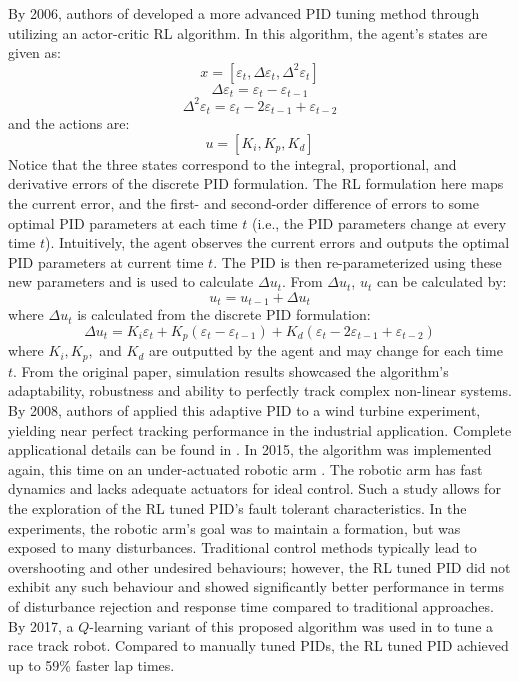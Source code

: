 By 2006, authors of \cite{pid2} developed a more advanced PID tuning method through utilizing an actor-critic RL algorithm.  In this algorithm, the agent's states are given as:
$$x = [\varepsilon_t, \Delta \varepsilon_t, \Delta^2 \varepsilon_t]$$
$$\Delta \varepsilon_t = \varepsilon_t - \varepsilon_{t-1}$$
$$\Delta^2 \varepsilon_t = \varepsilon_t - 2\varepsilon_{t-1} + \varepsilon_{t-2}$$
and the actions are:
$$u = [K_i, K_p, K_d]$$
Notice that the three states correspond to the integral, proportional, and derivative errors of the discrete PID formulation. The RL formulation here maps the current error, and the first- and second-order difference of errors to some optimal PID parameters at each time $t$ (i.e., the PID parameters change at every time $t$). Intuitively, the agent observes the current errors and outputs the optimal PID parameters at current time $t$. The PID is then re-parameterized using these new parameters and is used to calculate $\Delta u_t$.  From $\Delta u_t$, $u_t$ can be calculated by:
$$u_t = u_{t-1} + \Delta u_t$$
where $\Delta u_t$ is calculated from the discrete PID formulation:
\begin{equation}
    \Delta u_t = K_i \varepsilon_t + K_p (\varepsilon_t - \varepsilon_{t-1}) + K_d (\varepsilon_t - 2\varepsilon_{t-1} + \varepsilon_{t-2})
\end{equation}
where $K_i, K_p,$ and $K_d$ are outputted by the agent and may change for each time $t$. From the original paper, simulation results showcased the algorithm's adaptability, robustness and ability to perfectly track complex non-linear systems. By 2008, authors of \cite{pid3} applied this adaptive PID to a wind turbine experiment, yielding near perfect tracking performance in the industrial application.  Complete applicational details can be found in \cite{pid3}. In 2015, the algorithm was implemented again, this time on an under-actuated robotic arm \cite{pid4}. The robotic arm has fast dynamics and lacks adequate actuators for ideal control.  Such a study allows for the exploration of the RL tuned PID's fault tolerant characteristics.  In the experiments, the robotic arm's goal was to maintain a formation, but was exposed to many disturbances. Traditional control methods typically lead to overshooting and other undesired behaviours; however, the RL tuned PID did not exhibit any such behaviour and showed significantly better performance in terms of disturbance rejection and response time compared to traditional approaches. By 2017, a $Q$-learning variant of this proposed algorithm was used in \cite{pid5} to tune a race track robot.  Compared to manually tuned PIDs, the RL tuned PID achieved up to 59\% faster lap times. 

